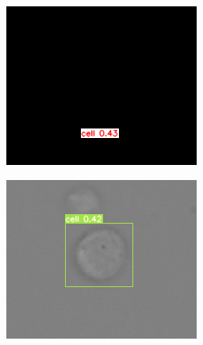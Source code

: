 \begin{figure}[h]
\begin{center}
\begin{subfigure}[b]{0.25\textwidth}
			\caption{}
			\label{fig:cellnet}
		\end{subfigure}
		\begin{subfigure}[b]{0.25\textwidth}
		    \centering
			\includegraphics[width=\textwidth]{thesis-template-master/images/gbciou3.png}
			\caption{}
			\label{fig:cellnet}
		\end{subfigure}
		\begin{subfigure}[b]{0.25\textwidth}
		    \centering
			\includegraphics[width=\textwidth]{thesis-template-master/images/gbciou7.png}
			\caption{}

\end{subfigure}
\end{center}
\end{figure}
